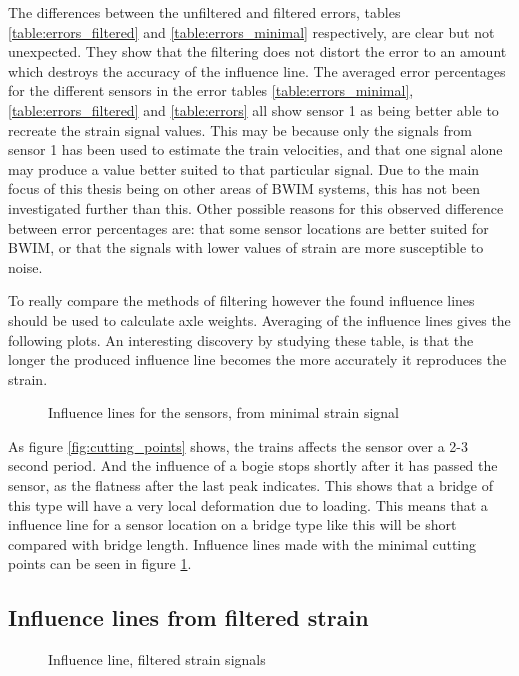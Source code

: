 The differences between the unfiltered and filtered errors, tables \ref{table:errors_filtered} and \ref{table:errors_minimal} respectively, are clear but not unexpected. They show that the filtering does not distort the error to an amount which destroys the accuracy of the influence line. The averaged error percentages for the different sensors in the error tables \ref{table:errors_minimal}, \ref{table:errors_filtered} and \ref{table:errors} all show sensor 1 as being better able to recreate the strain signal values. This may be because only the signals from sensor 1 has been used to estimate the train velocities, and that one signal alone may produce a value better suited to that particular signal. Due to the main focus of this thesis being on other areas of BWIM systems, this has not been investigated further than this. Other possible reasons for this observed difference between error percentages are: that some sensor locations are better suited for BWIM, or that the signals with lower values of strain are more susceptible to noise.

 To really compare the methods of filtering however the found influence lines should be used to calculate axle weights. Averaging of the influence lines gives the following plots.
An interesting discovery by studying these table, is that the longer the produced influence line becomes the more accurately it reproduces the strain.
\begin{figure}[H]
	\begin{adjustbox}{center}
		
	\end{adjustbox}
	\caption{Influence lines for the sensors, from minimal strain signal}
	\label{fig:infl_minimal}
\end{figure}
As figure \ref{fig:cutting_points} shows, the trains affects the sensor over a 2-3 second period. And the influence of a bogie stops shortly after it has passed the sensor, as the flatness after the last peak indicates. This shows that a bridge of this type will have a very local deformation due to loading. This means that a influence line for a sensor location on a bridge type like this will be short compared with bridge length. Influence lines made with the minimal cutting points can be seen in figure \ref{fig:infl_minimal}.

\subsection{Influence lines from filtered strain}
\begin{figure}[H]
	\centering
	\begin{adjustbox}{center}
		
	\end{adjustbox}
	\caption{Influence line, filtered strain signals}
	\label{fig:infl_avg_filtered_before}
\end{figure}

